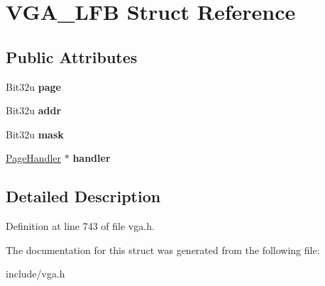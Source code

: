 \hypertarget{structVGA__LFB}{\section{V\-G\-A\-\_\-\-L\-F\-B Struct Reference}
\label{structVGA__LFB}
}
\subsection*{Public Attributes}
\begin{DoxyCompactItemize}
\item 
\hypertarget{structVGA__LFB_ac33c6c75c1e64552c88293115b1c1196}{Bit32u {\bfseries page}}\label{structVGA__LFB_ac33c6c75c1e64552c88293115b1c1196}

\item 
\hypertarget{structVGA__LFB_ad82dd223ea49e44ed0958ff21ae15f1d}{Bit32u {\bfseries addr}}\label{structVGA__LFB_ad82dd223ea49e44ed0958ff21ae15f1d}

\item 
\hypertarget{structVGA__LFB_aaf0a31db50d61b55ed20a81fb94de57c}{Bit32u {\bfseries mask}}\label{structVGA__LFB_aaf0a31db50d61b55ed20a81fb94de57c}

\item 
\hypertarget{structVGA__LFB_ac84a223414c76edc5fbd6742bfd8c720}{\hyperlink{classPageHandler}{Page\-Handler} $\ast$ {\bfseries handler}}\label{structVGA__LFB_ac84a223414c76edc5fbd6742bfd8c720}

\end{DoxyCompactItemize}


\subsection{Detailed Description}


Definition at line 743 of file vga.\-h.



The documentation for this struct was generated from the following file\-:\begin{DoxyCompactItemize}
\item 
include/vga.\-h\end{DoxyCompactItemize}
